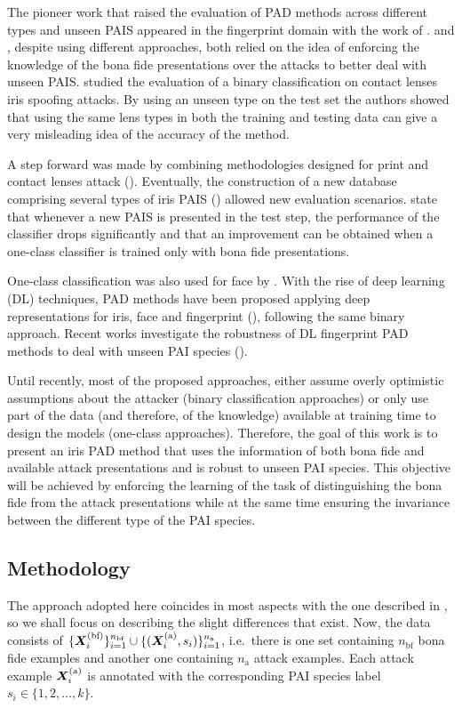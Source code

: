 The pioneer work that raised the evaluation of PAD methods across different types and unseen PAIS appeared in the fingerprint domain with the work of \citet{marasco2011robustness}. \citet{rattani2015openset} and \citet{sequeira2015fingerprint}, despite using different approaches, both relied on the idea of enforcing the knowledge of the bona fide presentations over the attacks to better deal with unseen PAIS. \citet{bowyer2014cosmetic} studied the evaluation of a binary classification on contact lenses iris spoofing attacks. By using an unseen type on the test set the authors showed that using the same lens types in both the training and testing data can give a very misleading idea of the accuracy of the method.

A step forward was made by combining methodologies designed for print and contact lenses attack (\citet{sequeira2014ildmma}). Eventually, the construction of a new database comprising several types of iris PAIS (\citet{raghavendra2015VSIA}) allowed new evaluation scenarios. \citet{sequeira2016realistic} state that whenever a new PAIS is presented in the test step, the performance of the classifier drops significantly and that an improvement can be obtained when a one-class classifier is trained only with bona fide presentations.

One-class classification was also used for face by \citet{kittler2017faceanomaly}. With the rise of deep learning (DL) techniques, PAD methods have been proposed applying deep representations for iris, face and fingerprint (\citet{menotti2015deep,pinto2018counteracting}), following the same binary approach. Recent works investigate the robustness of DL fingerprint PAD methods to deal with unseen PAI species (\citet{tolosana2018towards}).

Until recently, most of the proposed approaches, either assume overly optimistic assumptions about the attacker  (binary classification approaches) or only use part of the data (and therefore, of the knowledge) available at training time to design the models (one-class approaches). Therefore, the goal of this work is to present an iris PAD method that uses the information of both bona fide and available attack presentations and is robust to unseen PAI species. This objective will be achieved by enforcing the learning of the task of distinguishing the bona fide from the attack presentations while at the same time ensuring the invariance between the different type of the PAI species.

\subsection{Methodology}
\label{sec:adv_iris_attack_method}
The approach adopted here coincides in most aspects with the one described in , so we shall focus on describing the slight differences that exist. Now, the data consists of $\{{\bm{X}}^{(\text{bf})}_i\}_{i=1}^{n_{\text{bf}}} \cup \{({\bm{X}}^{(\text{a})}_i,s_i)\}_{i=1}^{n_{\text{a}}}$, i.e.\ there is one set containing $n_{\text{bf}}$ bona fide examples and another one containing $n_{\text{a}}$ attack examples. Each attack example ${\bm{X}}^{(\text{a})}_i$ is annotated with the corresponding PAI species label $s_i \in \{1,2,\dots,k\}$.

